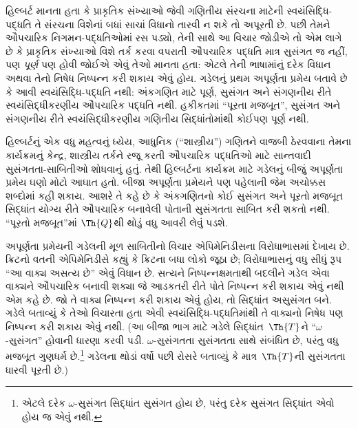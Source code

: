 \OLEndChapterHook
\endgroup


\begingroup
\makeatletter{}\makeatother

\label{guunit:OLP-0312}


\begingroup
\makeatletter{}\makeatother


\label{guunit:OLP-0313}


હિલ્બર્ટ માનતા હતા કે
પ્રાકૃતિક સંખ્યાઓ જેવી
ગણિતીય સંરચના માટેની
સ્વયંસિદ્ધિ-પદ્ધતિ તે
સંરચના વિશેનાં બધાં સાચાં
વિધાનો તારવી ન શકે તો
અપૂરતી છે. પછી તેમને
ઔપચારિક નિગમન-પદ્ધતિઓમાં
રસ પડ્યો, તેની સાથે આ
વિચાર જોડીએ તો એમ લાગે
છે કે પ્રાકૃતિક સંખ્યાઓ
વિશે તર્ક કરવા વપરાતી
ઔપચારિક પદ્ધતિ માત્ર
સુસંગત જ નહીં, પણ
\emph{પૂર્ણ} પણ હોવી જોઈએ
એવું તેઓ માનતા હતા:
એટલે તેની ભાષામાંનું દરેક
વિધાન અથવા તેનો નિષેધ
નિષ્પન્ન કરી શકાય એવું હોય.
ગડેલનું પ્રથમ અપૂર્ણતા
પ્રમેય બતાવે છે કે આવી
સ્વયંસિદ્ધિ-પદ્ધતિ નથી:
અંકગણિત માટે પૂર્ણ,
સુસંગત અને સંગણનીય રીતે
સ્વયંસિદ્ધીકરણીય
ઔપચારિક પદ્ધતિ નથી.
હકીકતમાં ``પૂરતા મજબૂત'',
સુસંગત અને સંગણનીય રીતે
સ્વયંસિદ્ધીકરણીય
ગણિતીય સિદ્ધાંતોમાંથી
કોઈપણ પૂર્ણ નથી.

હિલ્બર્ટનું એક વધુ મહત્વનું
ધ્યેય, આધુનિક
(``શાસ્ત્રીય'') ગણિતને
વાજબી ઠેરવવાના તેમના
કાર્યક્રમનું કેન્દ્ર, શાસ્ત્રીય
તર્કને રજૂ કરતી ઔપચારિક
પદ્ધતિઓ માટે સાન્તવાદી
સુસંગતતા-સાબિતીઓ શોધવાનું
હતું. તેથી હિલ્બર્ટના
કાર્યક્રમ માટે ગડેલનું
બીજું અપૂર્ણતા પ્રમેય
ઘણો મોટો આઘાત હતો.
બીજા અપૂર્ણતા પ્રમેયને પણ
પહેલાની જેમ અચોક્કસ
શબ્દોમાં કહી શકાય.
આશરે તે કહે છે કે
અંકગણિતનો કોઈ સુસંગત અને પૂરતો
મજબૂત સિદ્ધાંત
યોગ્ય રીતે ઔપચારિક બનાવેલી પોતાની સુસંગતતા સાબિત કરી
શકતો નથી. ``પૂરતો
મજબૂત''માં $\Th{Q}$થી
થોડું વધુ આવરી લેવું
પડશે.

અપૂર્ણતા પ્રમેયની ગડેલની
મૂળ સાબિતીનો વિચાર
એપિમેનિડીસના વિરોધાભાસમાં
દેખાય છે. ક્રિટનો વતની
એપિમેનિડીસે કહ્યું કે
ક્રિટના બધા લોકો જૂઠા છે;
વિરોધાભાસનું વધુ સીધું
રૂપ ``આ વાક્ય અસત્ય છે''
એવું વિધાન છે. સત્યને
નિષ્પન્નક્ષમતાથી બદલીને
ગડેલ એવા વાક્યને
ઔપચારિક બનાવી શક્યા જે
આડકતરી રીતે પોતે
નિષ્પન્ન કરી શકાય એવું નથી એમ
કહે છે. જો તે વાક્ય
નિષ્પન્ન કરી શકાય એવું હોય, તો
સિદ્ધાંત અસુસંગત બને.
ગડેલે બતાવ્યું કે તેઓ
વિચારતા હતા એવી
સ્વયંસિદ્ધિ-પદ્ધતિમાંથી
તે વાક્યનો નિષેધ
પણ નિષ્પન્ન કરી શકાય એવું નથી.
(આ બીજા ભાગ માટે ગડેલે
સિદ્ધાંત~$\Th{T}$ને
``$\omega$-સુસંગત''
હોવાની ધારણા કરવી પડી.
$\omega$-સુસંગતતા
સુસંગતતા સાથે સંબંધિત છે,
પરંતુ વધુ મજબૂત ગુણધર્મ
છે.\footnote{એટલે દરેક
$\omega$-સુસંગત સિદ્ધાંત
સુસંગત હોય છે, પરંતુ
દરેક સુસંગત સિદ્ધાંત
એવો હોય જ એવું
નથી.} ગડેલના થોડાં વર્ષો
પછી રોસરે બતાવ્યું કે
માત્ર~$\Th{T}$ની
સુસંગતતા ધારવી પૂરતી છે.)

